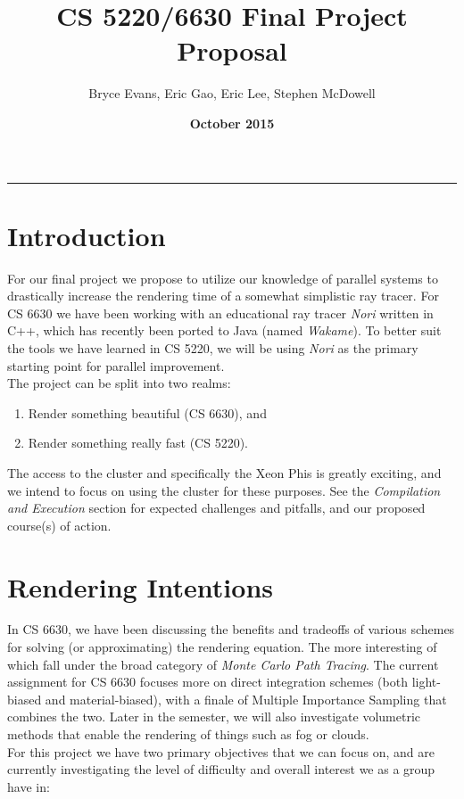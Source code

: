 \documentclass[11pt]{article}
\title{\textbf{CS 5220/6630 Final Project Proposal}}
\author{Bryce Evans, Eric Gao, Eric Lee, Stephen McDowell}
\date{\textbf{October 2015}}
\makeatletter
\renewcommand{\maketitle}{\bgroup\setlength{\parindent}{0pt}
\begin{flushleft}
  {\Large \textsc{\@title}}\newline
  \textsc{\@author}
  \rule{\textwidth}{1pt}
\end{flushleft}\egroup
}
\makeatother
\begin{document}
\thispagestyle{empty}
\maketitle
\section{Introduction}

For our final project we propose to utilize our knowledge of parallel systems to drastically increase the rendering time of a somewhat simplistic ray tracer.  For CS 6630 we have been working with an educational ray tracer \emph{Nori} written in C++, which has recently been ported to Java (named \emph{Wakame}).  To better suit the tools we have learned in CS 5220, we will be using \emph{Nori} as the primary starting point for parallel improvement.\\

The project can be split into two realms:

\begin{enumerate}[1.]
    \item Render something beautiful (CS 6630), and
    \item Render something really fast (CS 5220).
\end{enumerate}

The access to the cluster and specifically the Xeon Phis is greatly exciting, and we intend to focus on using the cluster for these purposes.  See the \emph{Compilation and Execution} section for expected challenges and pitfalls, and our proposed course(s) of action.

\section{Rendering Intentions}

In CS 6630, we have been discussing the benefits and tradeoffs of various schemes for solving (or approximating) the rendering equation.  The more interesting of which fall under the broad category of \emph{Monte Carlo Path Tracing}.  The current assignment for CS 6630 focuses more on direct integration schemes (both light-biased and material-biased), with a finale of Multiple Importance Sampling that combines the two.  Later in the semester, we will also investigate volumetric methods that enable the rendering of things such as fog or clouds.\\

For this project we have two primary objectives that we can focus on, and are currently investigating the level of difficulty and overall interest we as a group have in:
\end{document}
